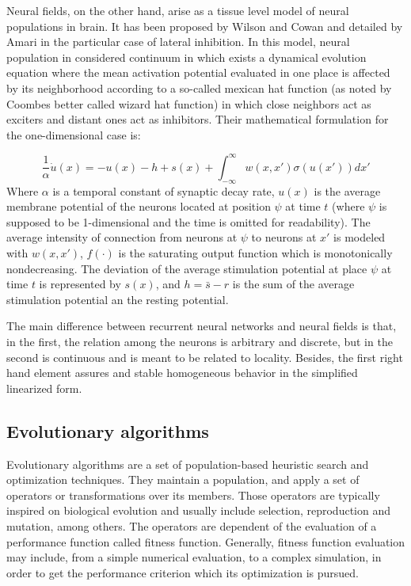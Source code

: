 \documentclass{sig-alternate}
\begin{document}
Neural fields, on the other hand, arise as a tissue level model of
neural populations in brain. It has been proposed by Wilson and Cowan
\cite{Wilson72Excitatory} and detailed by Amari \cite{Amari77Dynamics}
in the particular case of lateral inhibition. In this model, neural
population in considered continuum in which exists a dynamical
evolution equation where the mean activation potential evaluated in
one place is affected by its neighborhood according to a so-called
mexican hat function (as noted by Coombes \cite{Coombes05Waves} better
called wizard hat function) in which close neighbors act as exciters
and distant ones act as inhibitors. Their mathematical formulation for
the one-dimensional case is:

\begin{equation}
  \label{eq:neuralfield}
  \frac{1}{\alpha}
  \dot{u}(x)=-u(x)-h+s(x)+\int_{-\infty}^{\infty}{w(x,x')\sigma(u(x'))dx'}
\end{equation}
Where $\alpha$ is a temporal constant of synaptic decay rate, $u(x)$
is the average membrane potential of the neurons located at position
$\psi$ at time $t$ (where $\psi$ is supposed to be 1-dimensional and
the time is omitted for readability). The average intensity of
connection from neurons at $\psi$ to neurons at $x'$ is modeled with
$w(x,x')$, $f(\cdot)$ is the saturating output function which is
monotonically nondecreasing. The deviation of the average stimulation
potential at place $\psi$ at time $t$ is represented by $s(x)$, and
$h=\bar{s}-r$ is the sum of the average stimulation potential an the
resting potential.

The main difference between recurrent neural networks and neural
fields is that, in the first, the relation among the neurons is
arbitrary and discrete, but in the second is continuous and is meant
to be related to locality. Besides, the first right hand element
assures and stable homogeneous behavior in the simplified linearized
form.

\subsection*{Evolutionary algorithms}
Evolutionary algorithms are a set of population-based heuristic search
and optimization techniques. They maintain a population, and apply a
set of operators or transformations over its members. Those operators
are typically inspired on biological evolution and usually include
selection, reproduction and mutation, among others. The operators are
dependent of the evaluation of a performance function called fitness
function. Generally, fitness function evaluation may include, from a
simple numerical evaluation, to a complex simulation, in order to get
the performance criterion which its optimization is pursued.
\end{document}
